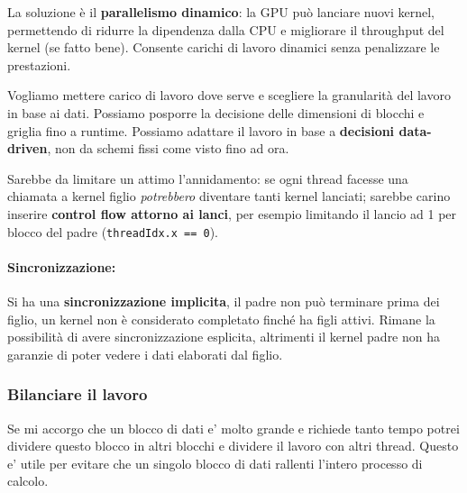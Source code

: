 La soluzione è il \textbf{parallelismo dinamico}: la GPU può lanciare nuovi kernel, permettendo di ridurre la dipendenza dalla CPU e migliorare il throughput del kernel (se fatto bene). Consente carichi di lavoro dinamici senza penalizzare le prestazioni.

Vogliamo mettere carico di lavoro dove serve e scegliere la granularità del lavoro in base ai dati. Possiamo posporre la decisione delle dimensioni di blocchi e griglia fino a runtime. Possiamo adattare il lavoro in base a \textbf{decisioni data-driven}, non da schemi fissi come visto fino ad ora.

Sarebbe da limitare un attimo l'annidamento: se ogni thread facesse una chiamata a kernel figlio \textit{potrebbero} diventare tanti kernel lanciati; sarebbe carino inserire \textbf{control flow attorno ai lanci}, per esempio limitando il lancio ad 1 per blocco del padre (\texttt{threadIdx.x == 0}).

\paragraph{Sincronizzazione:} Si ha una \textbf{sincronizzazione implicita}, il padre non può terminare prima dei figlio, un kernel non è considerato completato finché ha figli attivi. Rimane la possibilità di avere sincronizzazione esplicita, altrimenti il kernel padre non ha garanzie di poter vedere i dati elaborati dal figlio.

\subsubsection{Bilanciare il lavoro}
Se mi accorgo che un blocco di dati e' molto grande e richiede tanto tempo potrei dividere questo blocco in altri blocchi e dividere il lavoro con altri thread. Questo e' utile per evitare che un singolo blocco di dati rallenti l'intero processo di calcolo.